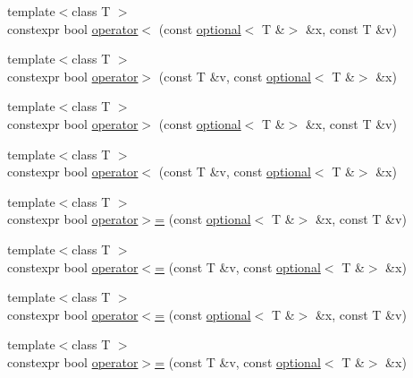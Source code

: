 \begin{DoxyCompactItemize}
\item 
{\footnotesize template$<$class T $>$ }\\constexpr bool \mbox{\hyperlink{namespacestd_1_1experimental_a83a84dd901351c69fb0e53efe17526eb}{operator$<$}} (const \mbox{\hyperlink{classstd_1_1experimental_1_1optional}{optional}}$<$ T \&$>$ \&x, const T \&v)
\item 
{\footnotesize template$<$class T $>$ }\\constexpr bool \mbox{\hyperlink{namespacestd_1_1experimental_a84d294fc6ef231696e23f6b21f0391aa}{operator$>$}} (const T \&v, const \mbox{\hyperlink{classstd_1_1experimental_1_1optional}{optional}}$<$ T \&$>$ \&x)
\item 
{\footnotesize template$<$class T $>$ }\\constexpr bool \mbox{\hyperlink{namespacestd_1_1experimental_a733d2aa90d49bd113f2420f996e13a8f}{operator$>$}} (const \mbox{\hyperlink{classstd_1_1experimental_1_1optional}{optional}}$<$ T \&$>$ \&x, const T \&v)
\item 
{\footnotesize template$<$class T $>$ }\\constexpr bool \mbox{\hyperlink{namespacestd_1_1experimental_ae8fc20bba7e30d2ad7bc8646ec1de715}{operator$<$}} (const T \&v, const \mbox{\hyperlink{classstd_1_1experimental_1_1optional}{optional}}$<$ T \&$>$ \&x)
\item 
{\footnotesize template$<$class T $>$ }\\constexpr bool \mbox{\hyperlink{namespacestd_1_1experimental_a8e331f49161fae9a2dc83a0838d5c332}{operator$>$=}} (const \mbox{\hyperlink{classstd_1_1experimental_1_1optional}{optional}}$<$ T \&$>$ \&x, const T \&v)
\item 
{\footnotesize template$<$class T $>$ }\\constexpr bool \mbox{\hyperlink{namespacestd_1_1experimental_a59ad44110fa8b750e2ca4cf69327c182}{operator$<$=}} (const T \&v, const \mbox{\hyperlink{classstd_1_1experimental_1_1optional}{optional}}$<$ T \&$>$ \&x)
\item 
{\footnotesize template$<$class T $>$ }\\constexpr bool \mbox{\hyperlink{namespacestd_1_1experimental_adeee1539a6ebda9088aaaa92a363a38c}{operator$<$=}} (const \mbox{\hyperlink{classstd_1_1experimental_1_1optional}{optional}}$<$ T \&$>$ \&x, const T \&v)
\item 
{\footnotesize template$<$class T $>$ }\\constexpr bool \mbox{\hyperlink{namespacestd_1_1experimental_af08a779caea9116149f04d2b2e330b44}{operator$>$=}} (const T \&v, const \mbox{\hyperlink{classstd_1_1experimental_1_1optional}{optional}}$<$ T \&$>$ \&x)

\end{DoxyCompactItemize}

